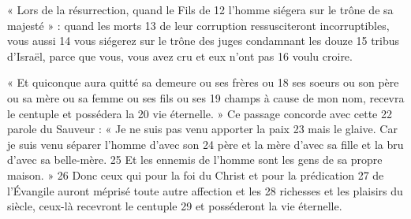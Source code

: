 « Lors de la résurrection, quand le Fils de	 
12	 	l'homme siégera sur le trône de sa majesté » : quand les morts	 
13	 	de leur corruption ressusciteront incorruptibles, vous aussi	 
14	 	vous siégerez sur le trône des juges condamnant les douze	 
15	 	tribus d'Israël, parce que vous, vous avez cru et eux n'ont pas	 
16	 	voulu croire.

« Et quiconque aura quitté sa demeure ou ses frères ou	 
18	 	ses soeurs ou son père ou sa mère ou sa femme ou ses fils ou ses	 
19	 	champs à cause de mon nom, recevra le centuple et possédera la	 
20	 	vie éternelle. » Ce passage concorde avec cette	 
22	 	parole du Sauveur : « Je ne suis pas venu apporter la paix	 
23	 	mais le glaive. Car je suis venu séparer l'homme d'avec son	 
24	 	père et la mère d'avec sa fille et la bru d'avec sa belle-mère.	 
25	 	Et les ennemis de l'homme sont les gens de sa propre maison. »	 
26	 	Donc ceux qui pour la foi du Christ et pour la prédication	 
27	 	de l'Évangile auront méprisé toute autre affection et les	 
28	 	richesses et les plaisirs du siècle, ceux-là recevront le centuple	 
29	 	et posséderont la vie éternelle.